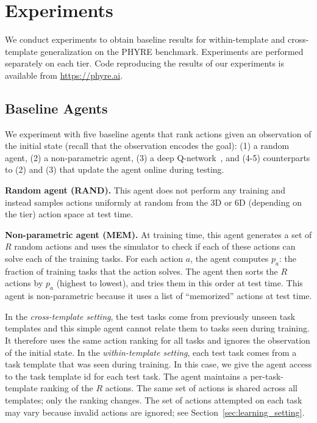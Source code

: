 \documentclass{article}
\begin{document}
\section{Experiments}
\label{sec:experiments}
We conduct experiments to obtain baseline results for within-template and cross-template generalization on the PHYRE benchmark. Experiments are performed separately on each tier. Code reproducing the results of our experiments is available from \url{https://phyre.ai}.

\subsection{Baseline Agents}
We experiment with five baseline agents that rank actions given an observation of the initial state (recall that the observation encodes the goal): (1) a random agent, (2) a non-parametric agent, (3) a deep Q-network~\cite{mnih2015atari}, and (4-5) counterparts to (2) and (3) that update the agent online during testing.

\noindent\textbf{Random agent (RAND).} This agent does not perform any training and instead samples actions uniformly at random from the 3D or 6D (depending on the tier) action space at test time.

\noindent\textbf{Non-parametric agent (MEM).} At training time, this agent generates a set of $R$ random actions and uses the simulator to check if each of these actions can solve each of the training tasks. For each action $a$, the agent computes $p_a$: the fraction of training tasks that the action solves. The agent then sorts the $R$ actions by $p_a$ (highest to lowest), and tries them in this order at test time. This agent is non-parametric because it uses a list of ``memorized'' actions at test time.

In the \emph{cross-template setting}, the test tasks come from previously unseen task templates and this simple agent cannot relate them to tasks seen during training. It therefore uses the same action ranking for all tasks and ignores the observation of the initial state. In the \emph{within-template setting}, each test task comes from a task template that was seen during training. In this case, we give the agent access to the task template id for each test task. The agent maintains a per-task-template ranking of the $R$ actions. The same set of actions is shared across all templates; only the ranking changes. The set of actions attempted on each task may vary because invalid actions are ignored; see Section~\ref{sec:learning_setting}.
\end{document}
